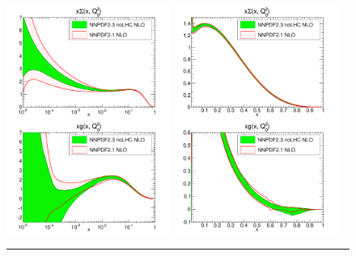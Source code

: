 \begin{figure}[hp!]
\centering
\includegraphics[width=0.48\textwidth]{6-LHCimpact/figs/xSinglet_Q_2_log-21-vs-23noLHC.pdf}
\includegraphics[width=0.48\textwidth]{6-LHCimpact/figs/xSinglet_Q_2_lin-21-vs-23noLHC.pdf}\\
\includegraphics[width=0.48\textwidth]{6-LHCimpact/figs/xg_Q_2_log-21-vs-23noLHC.pdf}
\includegraphics[width=0.48\textwidth]{6-LHCimpact/figs/xg_Q_2_lin-21-vs-23noLHC.pdf}

\noindent\rule[0.5ex]{\linewidth}{1pt}


\end{figure}
